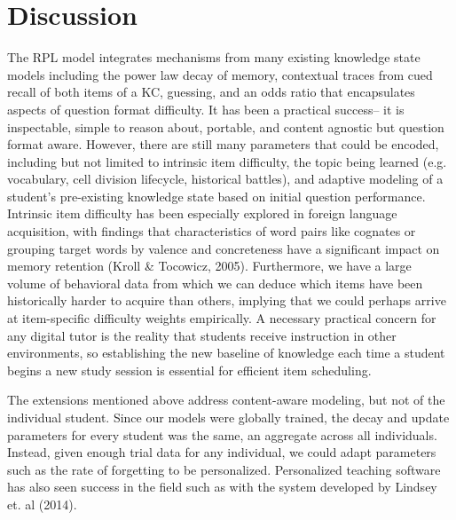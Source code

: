 \documentclass[a4paper,12pt]{article}
\begin{document}
\section{Discussion}
The RPL model integrates mechanisms from many existing knowledge state models including the power law decay of memory, contextual traces from cued recall of both items of a KC, guessing, and an odds ratio that encapsulates aspects of question format difficulty. It has been a practical success-- it is inspectable, simple to reason about, portable, and content agnostic but question format aware. However, there are still many parameters that could be encoded, including but not limited to intrinsic item difficulty, the topic being learned (e.g. vocabulary, cell division lifecycle, historical battles), and adaptive modeling of a student's pre-existing knowledge state based on initial question performance. Intrinsic item difficulty has been especially explored in foreign language acquisition, with findings that characteristics of word pairs like cognates or grouping target words by valence and concreteness have a significant impact on memory retention (Kroll \& Tocowicz, 2005). Furthermore, we have a large volume of behavioral data from which we can deduce which items have been historically harder to acquire than others, implying that we could perhaps arrive at item-specific difficulty weights empirically. A necessary practical concern for any digital tutor is the reality that students receive instruction in other environments, so establishing the new baseline of knowledge each time a student begins a new study session is essential for efficient item scheduling.

The extensions mentioned above address content-aware modeling, but not of the individual student. Since our models were globally trained, the decay and update parameters for every student was the same, an aggregate across all individuals. Instead, given enough trial data for any individual, we could adapt parameters such as the rate of forgetting to be personalized. Personalized teaching software has also seen success in the field such as with the system developed by Lindsey et. al (2014). 
\end{document}
